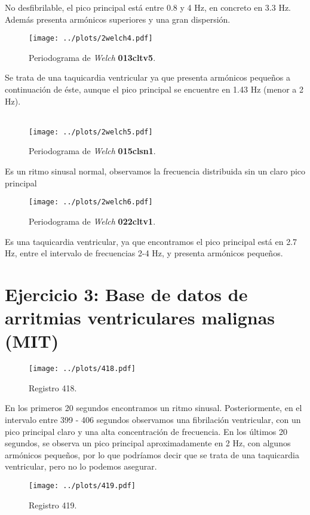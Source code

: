 \documentclass{article}
\begin{document}
No desfibrilable, el pico principal está entre 0.8 y 4 Hz, en concreto
en 3.3 Hz. Además presenta armónicos superiores y una gran dispersión.


\begin{figure}[h]
\centering
\texttt{[image: ../plots/2welch4.pdf]}
\caption{Periodograma de \textit{Welch} \textbf{013cltv5}.}
\end{figure}

 Se trata de una taquicardia ventricular ya que presenta armónicos
 pequeños a continuación de éste, aunque el pico principal se
 encuentre en 1.43 Hz (menor a 2 Hz).
\\\\
\begin{figure}[h]
\centering
\texttt{[image: ../plots/2welch5.pdf]}
\caption{Periodograma de \textit{Welch} \textbf{015clsn1}.}
\end{figure}

Es un ritmo sinusal normal, observamos la frecuencia distribuida sin
un claro pico principal

\begin{figure}[h]
\centering
\texttt{[image: ../plots/2welch6.pdf]}
\caption{Periodograma de \textit{Welch} \textbf{022cltv1}.}
\end{figure}

Es una taquicardia ventricular, ya que encontramos el pico principal
está en 2.7 Hz, entre el intervalo de frecuencias 2-4 Hz, y presenta
armónicos pequeños.

\newpage
\section{Ejercicio 3: Base de datos de arritmias ventriculares malignas (MIT)}
\begin{figure}[h]
\centering
\texttt{[image: ../plots/418.pdf]}
\caption{Registro 418.}
\end{figure}

En los primeros 20 segundos encontramos un ritmo sinusal.
Posteriormente, en el intervalo entre 399 - 406 segundos observamos una
fibrilación ventricular, con un pico principal claro y una alta
concentración de frecuencia. En los últimos 20 segundos, se observa un
pico principal aproximadamente en 2 Hz, con algunos armónicos
pequeños, por lo que podríamos decir que se trata de una taquicardia
ventricular, pero no lo podemos asegurar.
\newpage

\begin{figure}[h!]
\centering
\texttt{[image: ../plots/419.pdf]}
\vspace{-1cm}
\caption{Registro 419.}
\end{figure}
\end{document}
